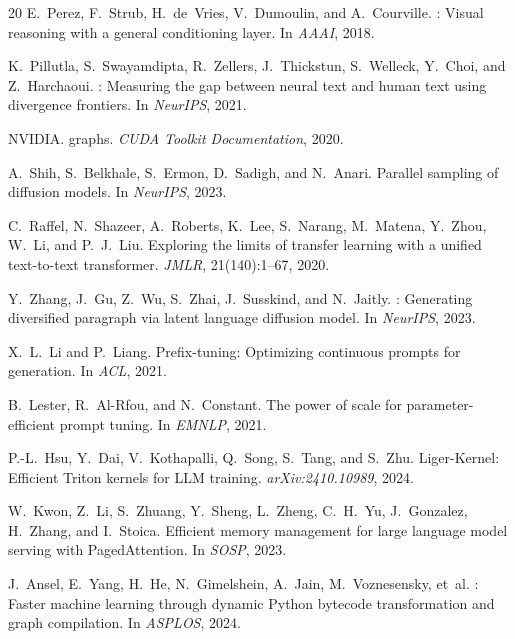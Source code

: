 \documentclass[sigconf,authordraft]{acmart}
\begin{document}
\begin{thebibliography}{20}
E.~Perez, F.~Strub, H.~de~Vries, V.~Dumoulin, and A.~Courville.
: Visual reasoning with a general conditioning layer.
\newblock In \emph{AAAI}, 2018.

K.~Pillutla, S.~Swayamdipta, R.~Zellers, J.~Thickstun, S.~Welleck, Y.~Choi, and Z.~Harchaoui.
: Measuring the gap between neural text and human text using divergence frontiers.
\newblock In \emph{NeurIPS}, 2021.

{NVIDIA}.
 graphs.
\newblock \emph{CUDA Toolkit Documentation}, 2020.

A.~Shih, S.~Belkhale, S.~Ermon, D.~Sadigh, and N.~Anari.
\newblock Parallel sampling of diffusion models.
\newblock In \emph{NeurIPS}, 2023.

C.~Raffel, N.~Shazeer, A.~Roberts, K.~Lee, S.~Narang, M.~Matena, Y.~Zhou, W.~Li, and P.~J.~Liu.
\newblock Exploring the limits of transfer learning with a unified text-to-text transformer.
\newblock \emph{JMLR}, 21(140):1--67, 2020.

Y.~Zhang, J.~Gu, Z.~Wu, S.~Zhai, J.~Susskind, and N.~Jaitly.
: Generating diversified paragraph via latent language diffusion model.
\newblock In \emph{NeurIPS}, 2023.

X.~L.~Li and P.~Liang.
\newblock Prefix-tuning: Optimizing continuous prompts for generation.
\newblock In \emph{ACL}, 2021.

B.~Lester, R.~Al-Rfou, and N.~Constant.
\newblock The power of scale for parameter-efficient prompt tuning.
\newblock In \emph{EMNLP}, 2021.

P.-L.~Hsu, Y.~Dai, V.~Kothapalli, Q.~Song, S.~Tang, and S.~Zhu.
\newblock Liger-Kernel: Efficient Triton kernels for {LLM} training.
\newblock \emph{arXiv:2410.10989}, 2024.

W.~Kwon, Z.~Li, S.~Zhuang, Y.~Sheng, L.~Zheng, C.~H.~Yu, J.~Gonzalez, H.~Zhang, and I.~Stoica.
\newblock Efficient memory management for large language model serving with {PagedAttention}.
\newblock In \emph{SOSP}, 2023.

J.~Ansel, E.~Yang, H.~He, N.~Gimelshein, A.~Jain, M.~Voznesensky, et~al.
: Faster machine learning through dynamic {Python} bytecode transformation and graph compilation.
\newblock In \emph{ASPLOS}, 2024.


\end{thebibliography}
\end{document}
